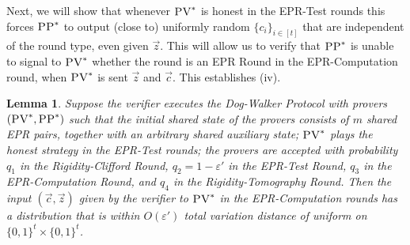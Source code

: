 \documentclass[11pt,letter]{article}
\newtheorem{lemma}[theorem]{Lemma}
\theoremstyle{remark}
\theoremstyle{definition}
\newcommand{\eps}{\varepsilon}
\newcommand{\pv}{\textsc{PV}}
\newcommand{\pp}{\textsc{PP}}
\newcommand{\anote}[1]{\textcolor{blue}{\small {\textbf{(Andrea:} #1 \textbf{) }}}}
\begin{document}
Next, we will show that whenever $\pv^*$ is honest in the EPR-Test rounds this forces $\pp^*$ to output (close to) uniformly random $\{c_i\}_{i\in [t]}$ that are independent of the round type, even given $\vec{z}$. This will allow us to verify that $\pp^*$ is unable to signal to $\pv^*$ whether the round is an EPR Round in the EPR-Computation round, when $\pv^*$ is sent $\vec{z}$ and $\vec{c}$. This establishes (iv). %


\begin{lemma}\label{lem:ci-unif}
Suppose the verifier executes the Dog-Walker Protocol with provers $(\pv^*,\pp^*)$ such that the initial shared state of the provers consists of $m$ shared EPR pairs, together with an arbitrary shared auxiliary state; $\pv^*$ plays the honest strategy in the EPR-Test rounds; the provers are accepted with probability $q_1$ in the Rigidity-Clifford Round, $q_2 = 1-\eps'$ in the EPR-Test Round, $q_3$ in the EPR-Computation Round, and $q_4$ in the Rigidity-Tomography Round. Then the input $(\vec{c},\vec{z})$ given by the verifier to $\pv^*$ in the EPR-Computation rounds has a distribution that is within $O(\eps')$ total variation distance of uniform on $\{0,1\}^t\times\{0,1\}^t$. 
\end{lemma}
\end{document}
